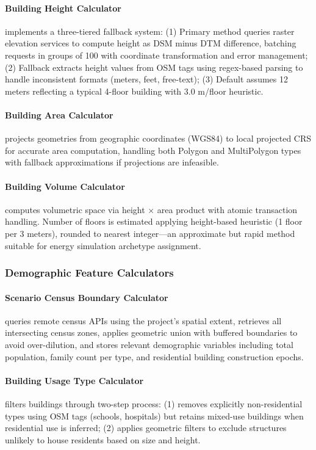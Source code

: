 \paragraph{Building Height Calculator} implements a three-tiered fallback system: (1) Primary method queries raster elevation services to compute height as DSM minus DTM difference, batching requests in groups of 100 with coordinate transformation and error management; (2) Fallback extracts height values from OSM tags using regex-based parsing to handle inconsistent formats (meters, feet, free-text); (3) Default assumes 12 meters reflecting a typical 4-floor building with 3.0 m/floor heuristic.

\paragraph{Building Area Calculator} projects geometries from geographic coordinates (WGS84) to local projected CRS for accurate area computation, handling both Polygon and MultiPolygon types with fallback approximations if projections are infeasible.

\paragraph{Building Volume Calculator} computes volumetric space via height $\times$ area product with atomic transaction handling. Number of floors is estimated applying height-based heuristic (1 floor per 3 meters), rounded to nearest integer---an approximate but rapid method suitable for energy simulation archetype assignment.

\subsubsection{Demographic Feature Calculators}

\paragraph{Scenario Census Boundary Calculator} queries remote census APIs using the project's spatial extent, retrieves all intersecting census zones, applies geometric union with buffered boundaries to avoid over-dilution, and stores relevant demographic variables including total population, family count per type, and residential building construction epochs.

\paragraph{Building Usage Type Calculator} filters buildings through two-step process: (1) removes explicitly non-residential types using OSM tags (schools, hospitals) but retains mixed-use buildings when residential use is inferred; (2) applies geometric filters to exclude structures unlikely to house residents based on size and height.

